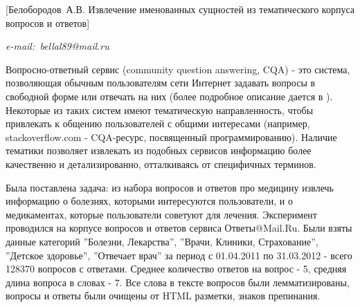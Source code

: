 ﻿\documentclass{article}
\begin{document}
[Белобородов~А.В. Извлечение именованных сущностей из тематического корпуса вопросов и ответов]%
\vspace{-1.75\baselineskip}

\centerline{\it e-mail:\ bellal89@mail.ru }
\vspace{\baselineskip}
Вопросно-ответный сервис (community question answering, CQA) - это система, позволяющая обычным пользователям сети Интернет задавать вопросы в свободной форме или отвечать на них (более подробное описание дается в \cite{BELOBORODOV1}). Некоторые из таких систем имеют тематическую направленность, чтобы привлекать к общению пользователей с общими интересами (например, stackoverflow.com - CQA-ресурс, посвященный программированию). Наличие тематики позволяет извлекать из подобных сервисов информацию более качественно и детализированно, отталкиваясь от специфичных терминов.

Была поставлена задача: из набора вопросов и ответов про медицину извлечь информацию о болезнях, которыми интересуются пользователи, и о медикаментах, которые пользователи советуют для лечения. Эксперимент проводился на корпусе вопросов и ответов сервиса Ответы@Mail.Ru. Были взяты данные категорий ''Болезни, Лекарства'', ''Врачи, Клиники, Страхование'', ''Детское здоровье'', ''Отвечает врач'' за период с 01.04.2011 по 31.03.2012 - всего 128370 вопросов с ответами. Среднее количество ответов на вопрос - 5, средняя длина вопроса в словах - 7. Все слова в тексте вопросов были лемматизированы, вопросы и ответы были очищены от HTML разметки, знаков препинания.
\end{document}
